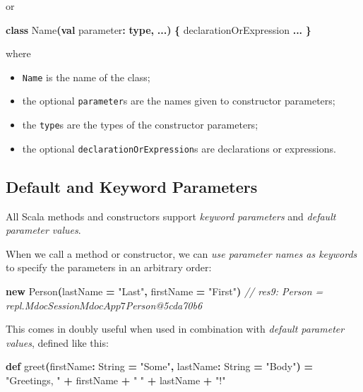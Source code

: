 \documentclass[11pt,a5paper,]{book}
\newenvironment{Shaded}{\begin{snugshade}}{\end{snugshade}}
\newcommand{\CommentTok}[1]{\textcolor[rgb]{0.56,0.35,0.01}{\textit{#1}}}
\newcommand{\ExtensionTok}[1]{#1}
\newcommand{\FunctionTok}[1]{\textcolor[rgb]{0.00,0.00,0.00}{#1}}
\newcommand{\KeywordTok}[1]{\textcolor[rgb]{0.13,0.29,0.53}{\textbf{#1}}}
\newcommand{\NormalTok}[1]{#1}
\newcommand{\OperatorTok}[1]{\textcolor[rgb]{0.81,0.36,0.00}{\textbf{#1}}}
\newcommand{\StringTok}[1]{\textcolor[rgb]{0.31,0.60,0.02}{#1}}
\providecommand{\tightlist}{%
  \setlength{\itemsep}{0pt}\setlength{\parskip}{0pt}}
\begin{document}
or

\begin{Shaded}
\begin{Highlighting}[]
\KeywordTok{class} \ExtensionTok{Name}\OperatorTok{(}\KeywordTok{val}\NormalTok{ parameter}\OperatorTok{:} \KeywordTok{type}\OperatorTok{,} \OperatorTok{...)} \OperatorTok{\{}
\NormalTok{  declarationOrExpression }\OperatorTok{...}
\OperatorTok{\}}
\end{Highlighting}
\end{Shaded}

where

\begin{itemize}
\tightlist
\item
  \texttt{Name} is the name of the class;
\item
  the optional \texttt{parameter}s are the names given to constructor
  parameters;
\item
  the \texttt{type}s are the types of the constructor parameters;
\item
  the optional \texttt{declarationOrExpression}s are declarations or
  expressions.
\end{itemize}

\hypertarget{default-and-keyword-parameters}{%
\subsection{Default and Keyword
Parameters}\label{default-and-keyword-parameters}}

All Scala methods and constructors support \emph{keyword parameters} and
\emph{default parameter values}.

When we call a method or constructor, we can \emph{use parameter names
as keywords} to specify the parameters in an arbitrary order:

\begin{Shaded}
\begin{Highlighting}[]
\KeywordTok{new} \FunctionTok{Person}\OperatorTok{(}\NormalTok{lastName }\OperatorTok{=} \StringTok{"Last"}\OperatorTok{,}\NormalTok{ firstName }\OperatorTok{=} \StringTok{"First"}\OperatorTok{)}
\CommentTok{// res9: Person = repl.MdocSession$MdocApp7$Person@5cda70b6}
\end{Highlighting}
\end{Shaded}

This comes in doubly useful when used in combination with \emph{default
parameter values}, defined like this:

\begin{Shaded}
\begin{Highlighting}[]
\KeywordTok{def} \FunctionTok{greet}\OperatorTok{(}\NormalTok{firstName}\OperatorTok{:} \ExtensionTok{String} \OperatorTok{=} \StringTok{"Some"}\OperatorTok{,}\NormalTok{ lastName}\OperatorTok{:} \ExtensionTok{String} \OperatorTok{=} \StringTok{"Body"}\OperatorTok{)} \OperatorTok{=}
  \StringTok{"Greetings, "} \OperatorTok{+}\NormalTok{ firstName }\OperatorTok{+} \StringTok{" "} \OperatorTok{+}\NormalTok{ lastName }\OperatorTok{+} \StringTok{"!"}
\end{Highlighting}
\end{Shaded}
\end{document}
